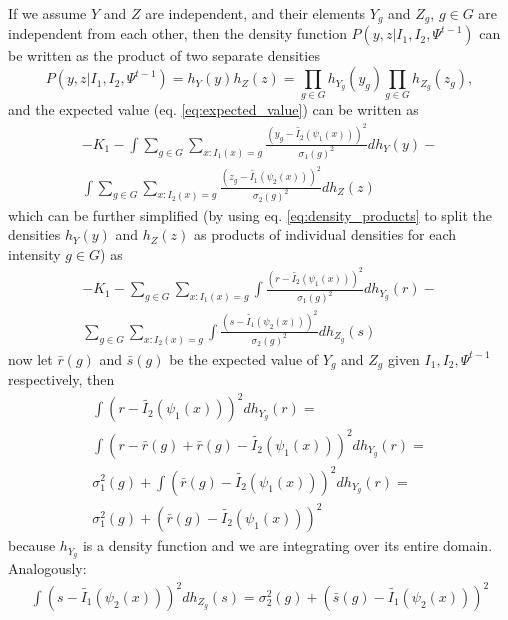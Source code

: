 \documentclass[11pt]{article}
\begin{document}
If we assume $Y$ and $Z$ are independent, and their elements $Y_g$ and $Z_g$, $g\in G$ are independent from each other, then the density function $P(y,z| I_{1}, I_{2}, \Psi^{t-1})$ can be written as the product of two separate densities
\begin{equation}\label{eq:density_products}
    P(y,z| I_{1}, I_{2}, \Psi^{t-1}) = h_{Y}(y)h_{Z}(z) = \prod_{g\in G}h_{Y_g}(y_g) \prod_{g\in G}h_{Z_g}(z_g),
\end{equation}
and the expected value (eq. \ref{eq:expected_value}) can be written as
\begin{align}
    -K_{1}-\int\sum_{g\in G} \sum_{x : I_{1}(x) = g} \frac{\left(y_g - \tilde{I_{2}}(\psi_{1}(x))\right)^{2}}{\sigma_{1}(g)^{2}}d h_{Y}(y)-\\
    \nonumber\int\sum_{g\in G} \sum_{x : I_{2}(x) = g} \frac{\left(z_g - \tilde{I_{1}}(\psi_{2}(x))\right)^{2}}{\sigma_{2}(g)^{2}}d h_{Z}(z)
\end{align}
which can be further simplified (by using eq. \ref{eq:density_products} to split the densities $h_{Y}(y)$ and $h_{Z}(z)$ as products of individual densities for each intensity $g \in G$) as
\begin{align}
    -K_{1}-\sum_{g\in G} \sum_{x : I_{1}(x) = g} \int\frac{\left(r - \tilde{I_{2}}(\psi_{1}(x))\right)^{2}}{\sigma_{1}(g)^{2}}d h_{Y_g}(r)-\\
    \nonumber\sum_{g\in G} \sum_{x : I_{2}(x) = g} \int\frac{\left(s - \tilde{I_{1}}(\psi_{2}(x))\right)^{2}}{\sigma_{2}(g)^{2}}d h_{Z_g}(s)
\end{align}
now let $\bar{r}(g)$ and $\bar{s}(g)$ be the expected value of $Y_g$ and $Z_g$ given $I_{1}, I_{2}, \Psi^{t-1}$ respectively, then
\begin{align}
    &\int\left(r - \tilde{I_{2}}(\psi_{1}(x))\right)^{2}d h_{Y_g}(r) = &\\
    &\nonumber \int\left(r - \bar{r}(g) + \bar{r}(g) - \tilde{I_{2}}(\psi_{1}(x))\right)^{2}d h_{Y_g}(r) = &\\
    &\nonumber \sigma^{2}_{1}(g) + \int\left(\bar{r}(g) - \tilde{I_{2}}(\psi_{1}(x))\right)^{2}d h_{Y_g}(r) = &\\
    &\nonumber \sigma^{2}_{1}(g) + \left(\bar{r}(g) - \tilde{I_{2}}(\psi_{1}(x))\right)^{2}&
\end{align}
because $h_{Y_g}$ is a density function and we are integrating over its entire domain. Analogously:
\begin{align}
    \int\left(s - \tilde{I_{1}}(\psi_{2}(x))\right)^{2}d h_{Z_g}(s) = \sigma^{2}_{2}(g) + \left(\bar{s}(g) - \tilde{I_{1}}(\psi_{2}(x))\right)^{2}
\end{align}
\end{document}
